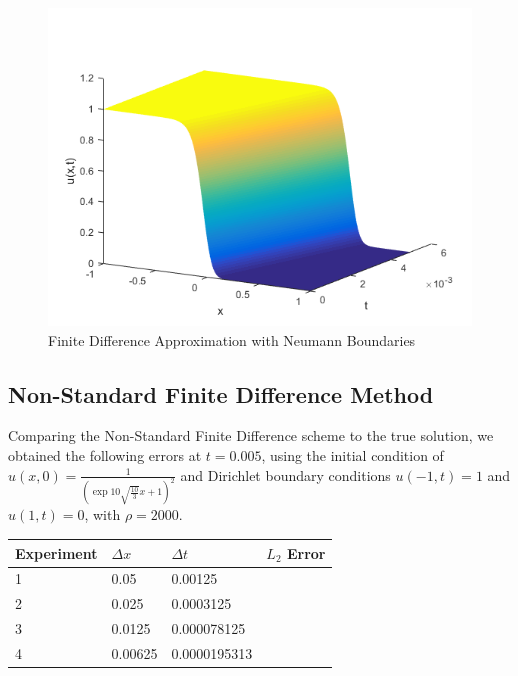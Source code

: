 \documentclass[a4paper]{article}
\begin{document}
    \begin{figure}[H]
    \caption{Finite Difference Approximation with Neumann Boundaries}
    \includegraphics[scale=0.8]{Fisher_Neumann_FiniteDifference.png}
    \end{figure}
	\subsection{Non-Standard Finite Difference Method}
    	Comparing the Non-Standard Finite Difference scheme to the true solution, we obtained the following errors at $t=0.005$, using the initial condition of $u(x,0)=\frac{1}{(\exp{10\sqrt{\frac{10}{3}}x}+1)^2}$ and Dirichlet boundary conditions $u(-1, t) = 1$ and $u(1, t) = 0$, with $\rho =2000$. 
    	
    	\begin{table}[H]
            \begin{tabular}{|l|l|l|l|}
            \hline
            Experiment & $\Delta x$ & $\Delta t$   & $L_2$ Error \\ \hline
            1          & 0.05       & 0.00125      &    \\ \hline
            2          & 0.025      & 0.0003125    &    \\ \hline
            3          & 0.0125     & 0.000078125  &   \\ \hline
            4          & 0.00625    & 0.0000195313 &   \\ \hline
            \end{tabular}
        \end{table}
	
\end{document}
